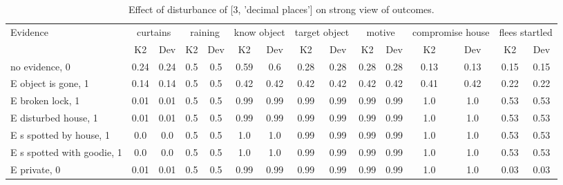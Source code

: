 \begin{table}\begin{tabular}{l|cc|cc|cc|cc|cc|cc|cc}\toprule\multirow{2}{*}{Evidence} & \multicolumn{2}{c}{curtains}& \multicolumn{2}{c}{raining}& \multicolumn{2}{c}{know object}& \multicolumn{2}{c}{target object}& \multicolumn{2}{c}{motive}& \multicolumn{2}{c}{compromise house}& \multicolumn{2}{c}{flees startled}\\& {K2} & {Dev}& {K2} & {Dev}& {K2} & {Dev}& {K2} & {Dev}& {K2} & {Dev}& {K2} & {Dev}& {K2} & {Dev}\\\midrule
no evidence, 0 & 0.24&0.24&0.5&0.5&0.59&0.6&0.28&0.28&0.28&0.28&0.13&0.13&0.15&0.15\\E object is gone, 1 & 0.14&0.14&0.5&0.5&0.42&0.42&0.42&0.42&0.42&0.42&0.41&0.42&0.22&0.22\\E broken lock, 1 & 0.01&0.01&0.5&0.5&0.99&0.99&0.99&0.99&0.99&0.99&1.0&1.0&0.53&0.53\\E disturbed house, 1 & 0.01&0.01&0.5&0.5&0.99&0.99&0.99&0.99&0.99&0.99&1.0&1.0&0.53&0.53\\E s spotted by house, 1 & 0.0&0.0&0.5&0.5&1.0&1.0&0.99&0.99&0.99&0.99&1.0&1.0&0.53&0.53\\E s spotted with goodie, 1 & 0.0&0.0&0.5&0.5&1.0&1.0&0.99&0.99&0.99&0.99&1.0&1.0&0.53&0.53\\E private, 0 & 0.01&0.01&0.5&0.5&0.99&0.99&0.99&0.99&0.99&0.99&1.0&1.0&0.03&0.03\\\bottomrule\end{tabular}\caption{Effect of disturbance of [3, 'decimal places'] on strong view of outcomes.}\end{table}